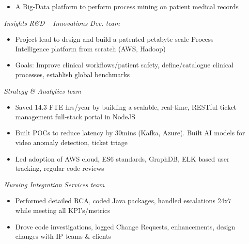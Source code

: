 \documentclass[10pt,a4paper,ragged2e,withhyper]{altacv}
\begin{document}
\begin{paracol}{2}


\begin{itemize}
\item A Big-Data platform to perform process mining on patient medical records  
\end{itemize}


\emph{Insights R\&D -- Innovations Dev. team}
\begin{itemize}
\item Project lead to design and build a patented petabyte scale Process Intelligence platform from scratch (AWS, Hadoop)
\item Goals: Improve clinical workflows/patient safety, define/catalogue clinical processes, establish global benchmarks
\end{itemize}

\divider

\emph{Strategy \& Analytics team}
\begin{itemize}
\item Saved 14.3 FTE hrs/year by building a scalable, real-time, RESTful ticket management full-stack portal in NodeJS
\item Built POCs to reduce latency by 30mins (Kafka, Azure). Built AI models for video anomaly detection, ticket triage
\item Led adoption of AWS cloud, ES6 standards, GraphDB, ELK based user tracking, regular code reviews
\end{itemize}

\divider

\emph{Nursing Integration Services team}
\begin{itemize}
\item Performed detailed RCA, coded Java packages, handled escalations 24x7 while meeting all KPI’s/metrics
\item Drove code investigations, logged Change Requests, enhancements, design changes with IP teams \& clients
\end{itemize}


\end{paracol}
\end{document}
